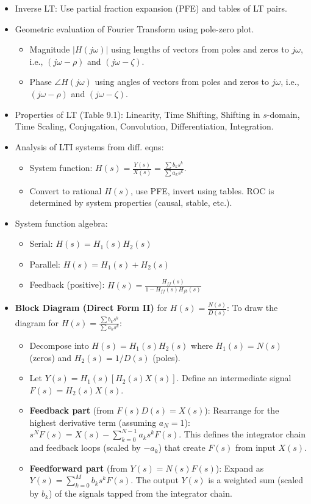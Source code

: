 \documentclass[10pt, twocolumn]{article}
\begin{document}
\begin{itemize}
\begin{itemize}
        \end{itemize}
    \item Inverse LT: Use partial fraction expansion (PFE) and tables of LT pairs.
    \item Geometric evaluation of Fourier Transform using pole-zero plot.
        \begin{itemize}
            \item Magnitude $|H(j\omega)|$ using lengths of vectors from poles and zeros to $j\omega$, i.e., $(j\omega - \rho)$ and $(j\omega - \zeta)$.
            \item Phase $\angle H(j\omega)$ using angles of vectors from poles and zeros to $j\omega$, i.e., $(j\omega - \rho)$ and $(j\omega - \zeta)$.
        \end{itemize}
    \item Properties of LT (Table 9.1): Linearity, Time Shifting, Shifting in $s$-domain, Time Scaling, Conjugation, Convolution, Differentiation, Integration.
    \item Analysis of LTI systems from diff. eqns:
        \begin{itemize}
            \item System function: $H(s) = \frac{Y(s)}{X(s)} = \frac{\sum b_k s^k}{\sum a_k s^k}$.
            \item Convert to rational $H(s)$, use PFE, invert using tables. ROC is determined by system properties (causal, stable, etc.).
        \end{itemize}
    \item System function algebra:
        \begin{itemize}
            \item Serial: $H(s) = H_1(s)H_2(s)$
            \item Parallel: $H(s) = H_1(s) + H_2(s)$
            \item Feedback (positive): $H(s) = \frac{H_{ff}(s)}{1 - H_{ff}(s)H_{fb}(s)}$
        \end{itemize}
    \item \textbf{Block Diagram (Direct Form II)} for $H(s) = \frac{N(s)}{D(s)}$: To draw the diagram for $H(s) = \frac{\sum b_k s^k}{\sum a_k s^k}$:
        \begin{itemize}
            \item Decompose into $H(s) = H_1(s)H_2(s)$ where $H_1(s)=N(s)$ (zeros) and $H_2(s)=1/D(s)$ (poles).
            \item Let $Y(s) = H_1(s)[H_2(s)X(s)]$. Define an intermediate signal $F(s) = H_2(s)X(s)$.
            \item \textbf{Feedback part} (from $F(s)D(s) = X(s)$): Rearrange for the highest derivative term (assuming $a_N=1$): $s^N F(s) = X(s) - \sum_{k=0}^{N-1} a_k s^k F(s)$. This defines the integrator chain and feedback loops (scaled by $-a_k$) that create $F(s)$ from input $X(s)$.
            \item \textbf{Feedforward part} (from $Y(s)=N(s)F(s)$): Expand as $Y(s) = \sum_{k=0}^M b_k s^k F(s)$. The output $Y(s)$ is a weighted sum (scaled by $b_k$) of the signals tapped from the integrator chain.
        \end{itemize}
\end{itemize}
\end{document}
